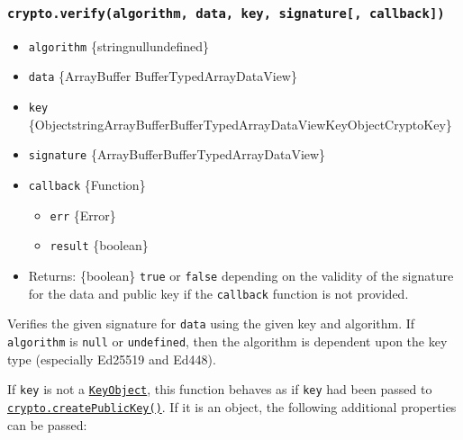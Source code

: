 \subsubsection{\texorpdfstring{\texttt{crypto.verify(algorithm,\ data,\ key,\ signature{[},\ callback{]})}}{crypto.verify(algorithm, data, key, signature{[}, callback{]})}}\label{crypto.verifyalgorithm-data-key-signature-callback}

\begin{itemize}
\tightlist
\item
  \texttt{algorithm} \{string\textbar null\textbar undefined\}
\item
  \texttt{data} \{ArrayBuffer\textbar{}
  Buffer\textbar TypedArray\textbar DataView\}
\item
  \texttt{key}
  \{Object\textbar string\textbar ArrayBuffer\textbar Buffer\textbar TypedArray\textbar DataView\textbar KeyObject\textbar CryptoKey\}
\item
  \texttt{signature}
  \{ArrayBuffer\textbar Buffer\textbar TypedArray\textbar DataView\}
\item
  \texttt{callback} \{Function\}

  \begin{itemize}
  \tightlist
  \item
    \texttt{err} \{Error\}
  \item
    \texttt{result} \{boolean\}
  \end{itemize}
\item
  Returns: \{boolean\} \texttt{true} or \texttt{false} depending on the
  validity of the signature for the data and public key if the
  \texttt{callback} function is not provided.
\end{itemize}

Verifies the given signature for \texttt{data} using the given key and
algorithm. If \texttt{algorithm} is \texttt{null} or \texttt{undefined},
then the algorithm is dependent upon the key type (especially Ed25519
and Ed448).

If \texttt{key} is not a \hyperref[class-keyobject]{\texttt{KeyObject}},
this function behaves as if \texttt{key} had been passed to
\hyperref[cryptocreatepublickeykey]{\texttt{crypto.createPublicKey()}}.
If it is an object, the following additional properties can be passed:

